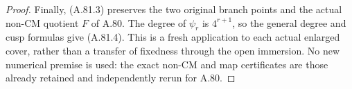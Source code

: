 \begin{proof}
Finally, (A.81.3) preserves the two original branch
points and the actual non-CM quotient \(F\) of A.80.
The degree of \(\psi_r\) is \(4^{r+1}\), so the
general degree and cusp formulas give (A.81.4).
This is a fresh application to each actual enlarged
cover, rather than a transfer of fixedness through
the open immersion. No new numerical premise is
used: the exact non-CM and map certificates are those
already retained and independently rerun for A.80.
\end{proof}
